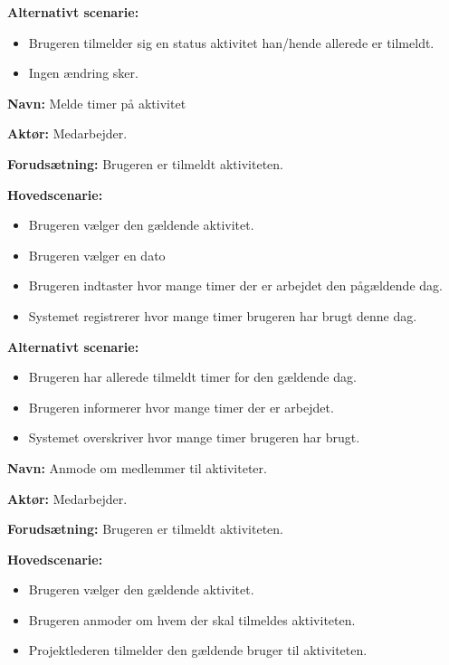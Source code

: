 \textbf{Alternativt scenarie:}

\begin{itemize}
    \item Brugeren tilmelder sig en status aktivitet han/hende allerede er tilmeldt.
    \item Ingen ændring sker.
\end{itemize}

\vspace{1 cm}

\textbf{Navn:} Melde timer på aktivitet

\textbf{Aktør:} Medarbejder.

\textbf{Forudsætning:} Brugeren er tilmeldt aktiviteten.

\textbf{Hovedscenarie: }

\begin{itemize}
    \item Brugeren vælger den gældende aktivitet.
    \item Brugeren vælger en dato
    \item Brugeren indtaster hvor mange timer der er arbejdet den pågældende dag.
    \item Systemet registrerer hvor mange timer brugeren har brugt denne dag.
\end{itemize}

\textbf{Alternativt scenarie:}

\begin{itemize}
    \item Brugeren har allerede tilmeldt timer for den gældende dag.
    
    \item Brugeren informerer hvor mange timer der er arbejdet.
    \item Systemet overskriver hvor mange timer brugeren har brugt.
\end{itemize}

\vspace{1 cm}

\textbf{Navn:} Anmode om medlemmer til aktiviteter.

\textbf{Aktør:} Medarbejder.

\textbf{Forudsætning:} Brugeren er tilmeldt aktiviteten.
    
\textbf{Hovedscenarie: }
    
\begin{itemize}
    \item Brugeren vælger den gældende aktivitet.
    \item Brugeren anmoder om hvem der skal tilmeldes aktiviteten.
    \item Projektlederen tilmelder den gældende bruger til aktiviteten.
\end{itemize}

